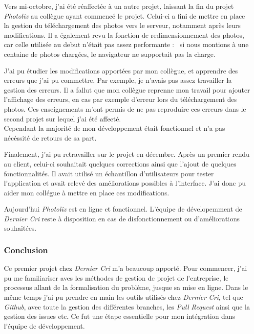 \bigskip

Vers mi-octobre, j'ai été réaffectée à un autre projet, laissant la fin
du projet \emph{Photolix} au collègue ayant commencé le projet. Celui-ci
a fini de mettre en place la gestion du téléchargement des photos vers
le serveur, notamment après leurs modifications. Il a également revu la
fonction de redimensionnement des photos, car celle utilisée au debut
n'était pas assez performante : ~si nous montions à une centaine de
photos chargées, le navigateur ne supportait pas la charge.

\bigskip

J'ai pu étudier les modifications apportées par mon collègue, et
apprendre des erreurs que j'ai pu commettre. Par exemple, je n'avais pas
assez travailler la gestion des erreurs. Il a fallut que mon collègue
reprenne mon travail pour ajouter l'affichage des erreurs, en cas par
exemple d'erreur lors du téléchargement des photos. Ces enseignements
m'ont permis de ne pas reproduire ces erreurs dans le second projet sur
lequel j'ai été affecté.\\
Cependant la majorité de mon développement était fonctionnel et n'a pas
nécéssité de retours de sa part.

\bigskip

Finalement, j'ai pu retravailler sur le projet en décembre. Après un
premier rendu au client, celui-ci souhaitait quelques corrections ainsi
que l'ajout de quelques fonctionnalités. Il avait utilisé un échantillon
d'utilisateurs pour tester l'application et avait relevé des
améliorations possibles à l'interface. J'ai donc pu aider mon collégue à
mettre en place ces modifications.

\bigskip

Aujourd'hui \emph{Photolix} est en ligne et fonctionnel. L'équipe de
dévelopemment de \emph{Dernier Cri} reste à disposition en cas de
disfonctionnement ou d'améliorations souhaitées.

\subsubsection{Conclusion}\label{conclusion}

\bigskip

Ce premier projet chez \emph{Dernier Cri} m'a beaucoup apporté. Pour
commencer, j'ai pu me familiariser aves les méthodes de gestion de
projet de l'entreprise, le processus allant de la formalisation du
probléme, jusque sa mise en ligne. Dans le même temps j'ai pu prendre en
main les outils utilisés chez \emph{Dernier Cri}, tel que \emph{Github},
avec toute la gestion des différentes branches, les \emph{Pull Request}
ainsi que la gestion des issues etc. Ce fut une étape essentielle pour
mon intégration dans l'équipe de développement.

